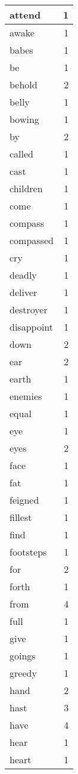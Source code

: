 \begin{center}
\begin{longtable}{l|r}
attend & 1\\ \hline 
awake & 1\\ \hline 
babes & 1\\ \hline 
be & 1\\ \hline 
behold & 2\\ \hline 
belly & 1\\ \hline 
bowing & 1\\ \hline 
by & 2\\ \hline 
called & 1\\ \hline 
cast & 1\\ \hline 
children & 1\\ \hline 
come & 1\\ \hline 
compass & 1\\ \hline 
compassed & 1\\ \hline 
cry & 1\\ \hline 
deadly & 1\\ \hline 
deliver & 1\\ \hline 
destroyer & 1\\ \hline 
disappoint & 1\\ \hline 
down & 2\\ \hline 
ear & 2\\ \hline 
earth & 1\\ \hline 
enemies & 1\\ \hline 
equal & 1\\ \hline 
eye & 1\\ \hline 
eyes & 2\\ \hline 
face & 1\\ \hline 
fat & 1\\ \hline 
feigned & 1\\ \hline 
fillest & 1\\ \hline 
find & 1\\ \hline 
footsteps & 1\\ \hline 
for & 2\\ \hline 
forth & 1\\ \hline 
from & 4\\ \hline 
full & 1\\ \hline 
give & 1\\ \hline 
goings & 1\\ \hline 
greedy & 1\\ \hline 
hand & 2\\ \hline 
hast & 3\\ \hline 
have & 4\\ \hline 
hear & 1\\ \hline 
heart & 1\\ \hline 

\end{longtable}
\end{center}
